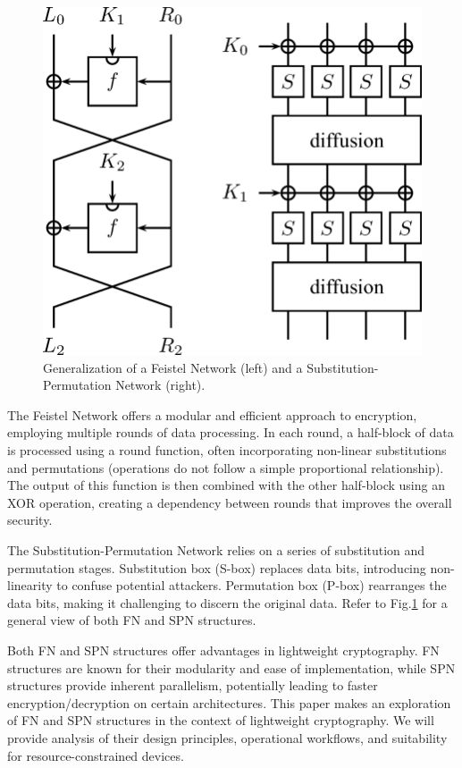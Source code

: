 \documentclass[conference]{IEEEtran}
\begin{document}
\begin{figure}
    \centering
    \includegraphics[width=\columnwidth]{figures/FEISTEL-SPN.png}
    \caption{Generalization of a Feistel Network (left) and a Substitution-Permutation Network (right)\cite{de2006introduction}.}
    \label{fig:FEISTEL-SPN}
\end{figure}

The Feistel Network offers a modular and efficient approach to encryption, employing multiple rounds of data processing. In each round, a half-block of data is processed using a round function, often incorporating non-linear substitutions and permutations (operations do not follow a simple proportional relationship). The output of this function is then combined with the other half-block using an XOR operation, creating a dependency between rounds that improves the overall security\cite{FEISTEL}.

The Substitution-Permutation Network relies on a series of substitution and permutation stages. Substitution box (S-box) replaces data bits, introducing non-linearity to confuse potential attackers. Permutation box (P-box) rearranges the data bits, making it challenging to discern the original data\cite{heys1996substitution}. Refer to Fig.\ref{fig:FEISTEL-SPN} for a general view of both FN and SPN structures.

Both FN and SPN structures offer advantages in lightweight cryptography. FN structures are known for their modularity and ease of implementation, while SPN structures provide inherent parallelism, potentially leading to faster encryption/decryption on certain architectures.
This paper makes an exploration of FN and SPN structures in the context of lightweight cryptography. We will provide analysis of their design principles, operational workflows, and suitability for resource-constrained devices.
\end{document}
